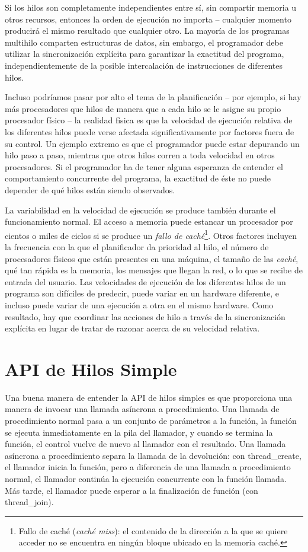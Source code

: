 \documentclass[10pt]{book}
\begin{document}
Si los hilos son completamente independientes entre sí, sin compartir memoria u otros recursos, entonces la orden de ejecución no importa -- cualquier momento producirá el mismo resultado que cualquier otro. La mayoría de los programas multihilo comparten estructuras de datos, sin embargo, el programador debe utilizar la sincronización explícita para garantizar la exactitud del programa, independientemente de la posible intercalación de instrucciones de diferentes hilos.

Incluso podríamos pasar por alto el tema de la planificación -- por ejemplo, si hay más procesadores que hilos de manera que a cada hilo se le asigne su propio procesador físico -- la realidad física es que la velocidad de ejecución relativa de los diferentes hilos puede verse afectada significativamente por factores fuera de su control. Un ejemplo extremo es que el programador puede estar depurando un hilo paso a paso, mientras que otros hilos corren a toda velocidad en otros procesadores. Si el programador ha de tener alguna esperanza de entender el comportamiento concurrente del programa, la exactitud de éste no puede depender de qué hilos están siendo observados.

La variabilidad en la velocidad de ejecución se produce también durante el funcionamiento normal. El acceso a memoria puede estancar un procesador por cientos o miles de ciclos si se produce un \textit{fallo de caché}\footnote{Fallo de caché (\textit{caché miss}): el contenido de la dirección a la que se quiere acceder no se encuentra en ningún bloque ubicado en la memoria caché.}. Otros factores incluyen la frecuencia con la que el planificador da prioridad al hilo, el número de procesadores físicos que están presentes en una máquina, el tamaño de las \textit{caché}, qué tan rápida es la memoria, los mensajes que llegan la red, o lo que se recibe de entrada del usuario. Las velocidades de ejecución de los diferentes hilos de un programa son difíciles de predecir, puede variar en un hardware diferente, e incluso puede variar de una ejecución a otra en el mismo hardware. Como resultado, hay que coordinar las acciones de hilo a través de la sincronización explícita en lugar de tratar de razonar acerca de su velocidad relativa.

\section{API de Hilos Simple}
Una buena manera de entender la API de hilos simples es que proporciona una manera de invocar una llamada asíncrona a procedimiento. Una llamada de procedimiento normal pasa a un conjunto de parámetros a la función, la función se ejecuta inmediatamente en la pila del llamador, y cuando se termina la función, el control vuelve de nuevo al llamador con el resultado. Una llamada asíncrona a procedimiento separa la llamada de la devolución: con {\mf thread\_create}, el llamador inicia la función, pero a diferencia de una llamada a procedimiento normal, el llamador continúa la ejecución concurrente con la función llamada. Más tarde, el llamador puede esperar a la finalización de función (con {\mf thread\_join}).
\end{document}
